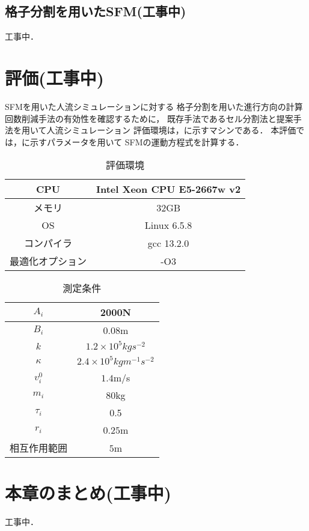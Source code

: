 \subsection{格子分割を用いたSFM(工事中)}
工事中．

\section{評価(工事中)}
SFMを用いた人流シミュレーションに対する
格子分割を用いた進行方向の計算回数削減手法の有効性を確認するために，
既存手法であるセル分割法と提案手法を用いて人流シミュレーション
評価環境は，に示すマシンである．
本評価では，に示すパラメータを用いて
SFMの運動方程式を計算する．


\begin{table}[tb]
  \begin{center}
    \caption{評価環境}
      \label{tb:result_env}
      \begin{tabular}{c|c}
      \hline \hline
      CPU              & Intel Xeon CPU E5-2667w v2 \\ \hline
      メモリ           & 32GB                       \\ \hline
      OS               & Linux 6.5.8               \\ \hline
      コンパイラ       & gcc 13.2.0                  \\ \hline
      最適化オプション & -O3                        \\ \hline
    \end{tabular}
  \end{center}
\end{table}

\begin{table}[tb]
  \begin{center}
    \caption{測定条件}
    \label{tb:result_para}
    \begin{tabular}{c|c}
      \hline \hline
      $A_i$            & 2000N                              \\ \hline 
      $B_i$            & 0.08m                              \\ \hline 
      $k$              & $1.2 \times 10^5 kg s^{-2} $       \\ \hline 
      $\kappa$         & $2.4 \times 10^5 kg m^{-1} s^{-2}$ \\ \hline 
      $v_i^0$          & $1.4$m/s                           \\ \hline 
      $m_i$            & $80$kg                             \\ \hline 
      $\tau_i$         & 0.5                               \\ \hline 
      $r_i$            & $0.25$m                            \\ \hline 
      相互作用範囲     & $5$m                              \\ \hline 
    \end{tabular}
  \end{center}
\end{table}


\section{本章のまとめ(工事中)}
工事中．

